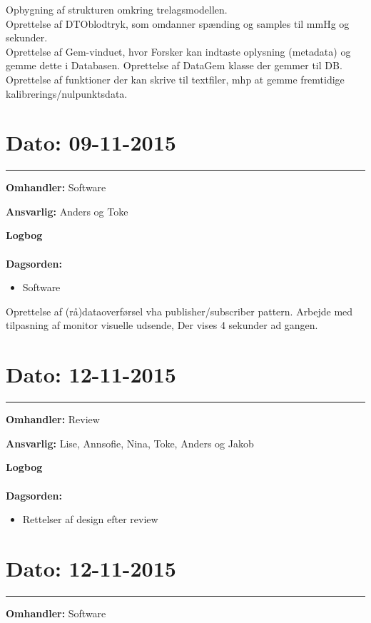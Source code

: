 Opbygning af strukturen omkring trelagsmodellen. \\
Oprettelse af DTOblodtryk, som omdanner spænding og samples til mmHg og sekunder. \\
Oprettelse af Gem-vinduet, hvor Forsker kan indtaste oplysning (metadata) og gemme dette i Databasen. 
Oprettelse af DataGem klasse der gemmer til DB.
Oprettelse af funktioner der kan skrive til textfiler, mhp at gemme fremtidige kalibrerings/nulpunktsdata.




\section{Dato: 09-11-2015 }
\hrule

\textbf{Omhandler:} Software

\textbf{Ansvarlig:} Anders og Toke

\textbf{Logbog}
\\
\\
\textbf{Dagsorden:}
\begin{itemize}
	\item Software
\end{itemize}

Oprettelse af (rå)dataoverførsel vha publisher/subscriber pattern. Arbejde med tilpasning af monitor visuelle udsende, Der vises 4 sekunder ad gangen.


\section{Dato: 12-11-2015 }
\hrule

\textbf{Omhandler:} Review 

\textbf{Ansvarlig:} Lise, Annsofie, Nina, Toke, Anders og Jakob

\textbf{Logbog}
\\
\\
\textbf{Dagsorden:}
\begin{itemize}
	\item Rettelser af design efter review
\end{itemize}



\section{Dato: 12-11-2015 }
\hrule

\textbf{Omhandler:} Software

